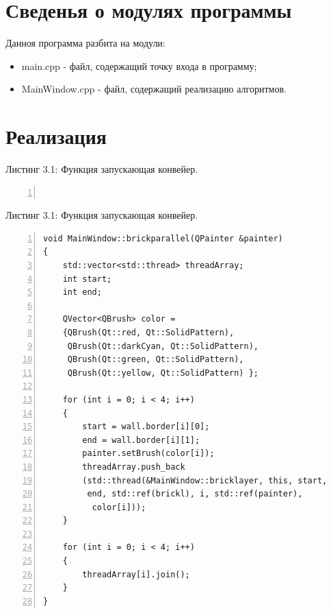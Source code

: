 \documentclass[12pt,a4paper]{report}
\begin{document}
\section{Сведенья о модулях программы}

Данноя программа разбита на модули:

\begin{itemize}
	\item main.cpp - файл, содержащий точку входа в программу;
	\item MainWindow.cpp - файл, содержащий реализацию алгоритмов.
\end{itemize}



\section{Реализация}

\noindent\textrm{Листинг 3.1: Функция запускающая конвейер.}
\begin{lstlisting}[frame=single, numbers=left]
	
\end{lstlisting}


\noindent\textrm{Листинг 3.1: Функция запускающая конвейер.}
\begin{lstlisting}[frame=single, numbers=left]
void MainWindow::brickparallel(QPainter &painter)
{
    std::vector<std::thread> threadArray;
    int start;
    int end;
	
    QVector<QBrush> color = 
    {QBrush(Qt::red, Qt::SolidPattern),
     QBrush(Qt::darkCyan, Qt::SolidPattern), 
     QBrush(Qt::green, Qt::SolidPattern),
     QBrush(Qt::yellow, Qt::SolidPattern) };
	
    for (int i = 0; i < 4; i++)
    {
        start = wall.border[i][0];
        end = wall.border[i][1];
        painter.setBrush(color[i]);
        threadArray.push_back
        (std::thread(&MainWindow::bricklayer, this, start,
         end, std::ref(brickl), i, std::ref(painter),
          color[i]));
    }
	
    for (int i = 0; i < 4; i++)
    {
        threadArray[i].join();
    }
}	
\end{lstlisting}
\end{document}
